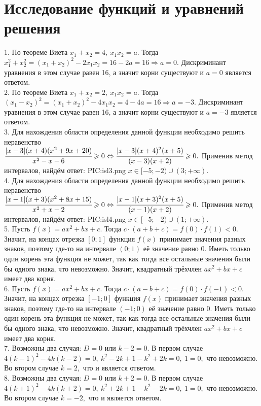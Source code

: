 \section{Исследование функций и уравнений решения}
1. По теореме Виета $x_1+x_2=4,\ x_1x_2=a.$ Тогда $x_1^2+x_2^2=(x_1+x_2)^2-2x_1x_2=16-2a=16\Rightarrow a=0.$ Дискриминант уравнения в этом случае равен 16, а значит корни существуют и $a=0$ является ответом.\\
2. По теореме Виета $x_1+x_2=2,\ x_1x_2=a.$ Тогда $(x_1-x_2)^2=(x_1+x_2)^2-4x_1x_2=4-4a=16\Rightarrow a=-3.$ Дискриминант уравнения в этом случае равен 16, а значит корни существуют и $a=-3$ является ответом.\\
3. Для нахождения области определения данной функции необходимо решить неравенство\\ $\cfrac{|x-3|(x+4)(x^2+9x+20)}{x^2-x-6}\geqslant0\Leftrightarrow
\cfrac{|x-3|(x+4)^2(x+5)}{(x-3)(x+2)}\geqslant0.$ Применив метод интервалов, найдём ответ:
{{PIC:isl3.png}}
$x\in[-5;-2)\cup(3;+\infty).$\\
4. Для нахождения области определения данной функции необходимо решить неравенство\\ $\cfrac{|x-1|(x+3)(x^2+8x+15)}{x^2+x-2}\geqslant0\Leftrightarrow
\cfrac{|x-1|(x+3)^2(x+5)}{(x-1)(x+2)}\geqslant0.$ Применив метод интервалов, найдём ответ:
{{PIC:isl4.png}}
$x\in[-5;-2)\cup(1;+\infty).$\\
5. Пусть $f(x)=ax^2+bx+c.$ Тогда $c\cdot(a+b+c)=f(0)\cdot f(1)<0.$ Значит, на концах отрезка $[0;1]$ функция $f(x)$ принимает значения разных знаков, поэтому где-то на интервале $(0;1)$ её значение равно 0. Иметь только один корень эта функция не может, так как тогда все остальные значения были бы одного знака, что невозможно. Значит, квадратный трёхчлен $ax^2+bx+c$ имеет два корня.\\
6. Пусть $f(x)=ax^2+bx+c.$ Тогда $c\cdot(a-b+c)=f(0)\cdot f(-1)<0.$ Значит, на концах отрезка $[-1;0]$ функция $f(x)$ принимает значения разных знаков, поэтому где-то на интервале $(-1;0)$ её значение равно 0. Иметь только один корень эта функция не может, так как тогда все остальные значения были бы одного знака, что невозможно. Значит, квадратный трёхчлен $ax^2+bx+c$ имеет два корня.\\
7. Возможны два случая: $D=0$ или $k-2=0.$ В первом случае $4(k-1)^2-4k(k-2)=0,\ k^2-2k+1-k^2+2k=0,\ 1=0,$ что невозможно. Во втором случае $k=2,$ что и является ответом.\\
8. Возможны два случая: $D=0$ или $k+2=0.$ В первом случае $4(k+1)^2-4k(k+2)=0,\ k^2+2k+1-k^2-2k=0,\ 1=0,$ что невозможно. Во втором случае $k=-2,$ что и является ответом.\\
